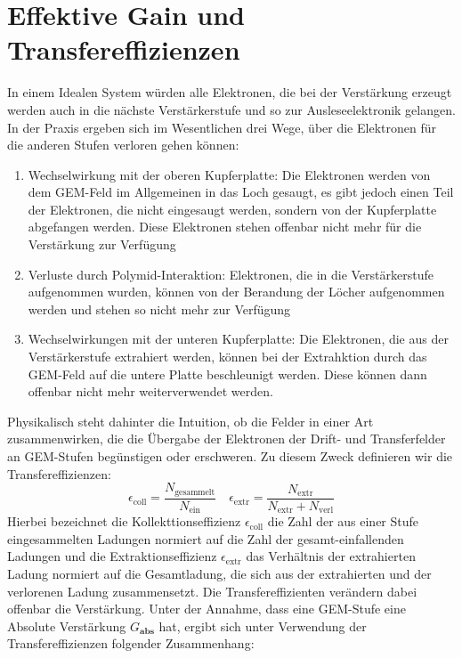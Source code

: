 \section{Effektive Gain und Transfereffizienzen}
In einem Idealen System würden alle Elektronen, die bei der Verstärkung erzeugt werden auch in die nächste Verstärkerstufe und so zur Ausleseelektronik gelangen. In der Praxis ergeben sich im Wesentlichen drei Wege, über die Elektronen für die anderen Stufen verloren gehen können:
\begin{enumerate}
	\item Wechselwirkung mit der oberen Kupferplatte: Die Elektronen werden von dem GEM-Feld im Allgemeinen in das Loch gesaugt, es gibt jedoch einen Teil der Elektronen, die nicht eingesaugt werden, sondern von der Kupferplatte abgefangen werden. Diese Elektronen stehen offenbar nicht mehr für die Verstärkung zur Verfügung
	\item Verluste durch Polymid-Interaktion: Elektronen, die in die Verstärkerstufe aufgenommen wurden, können von der Berandung der Löcher aufgenommen werden und stehen so nicht mehr zur Verfügung
	\item Wechselwirkungen mit der unteren Kupferplatte: Die Elektronen, die aus der Verstärkerstufe extrahiert werden, können bei der Extrahktion durch das GEM-Feld auf die untere Platte beschleunigt werden. Diese können dann offenbar nicht mehr weiterverwendet werden. 
\end{enumerate}
Physikalisch steht dahinter die Intuition, ob die Felder in einer Art zusammenwirken, die die Übergabe der Elektronen der Drift- und Transferfelder an GEM-Stufen begünstigen oder erschweren. Zu diesem Zweck definieren wir die Transfereffizienzen:
\begin{equation*}
	\epsilon_{\text{coll}}=\frac{N_{\text{gesammelt}}}{N_{\text{ein}}} \quad \epsilon_{\text{extr}}=\frac{N_{\text{extr}}}{N_{\text{extr}}+N_{\text{verl}}}
\end{equation*}
Hierbei bezeichnet die Kollekttionseffizienz $\epsilon_{\text{coll}}$ die Zahl der aus einer Stufe eingesammelten Ladungen normiert auf die Zahl der gesamt-einfallenden Ladungen und die Extraktionseffizienz $\epsilon_{\text{extr}}$ das Verhältnis der extrahierten Ladung normiert auf die Gesamtladung, die sich aus der extrahierten und der verlorenen Ladung zusammensetzt. Die Transfereffizienten verändern dabei offenbar die Verstärkung. Unter der Annahme, dass eine GEM-Stufe eine Absolute Verstärkung $G_{\textbf{abs}}$ hat, ergibt sich unter Verwendung der Transfereffizienzen folgender Zusammenhang:
